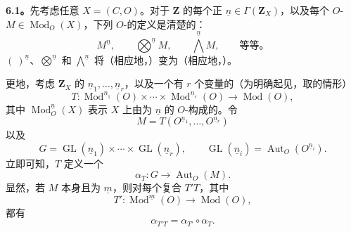 
\textbf{6.1。}先考虑任意 $X=(C,O)$。对于 $\mathbf Z$ 的每个正 $\underline n\in\Gamma(\mathbf Z_X)$，以及每个 $O$- $M\in\operatorname{Mod}_O(X)$，下列 $O$-的定义是清楚的：
\[
 M^{\underline n},\qquad \bigotimes^{\underline n}M,\qquad
 \bigwedge^{\underline n}M,\qquad\text{等等。}
 \tag{6.1.1}
\]
 $(\ )^{\underline n}$、$\bigotimes^{\underline n}$ 和 $\bigwedge^{\underline n}$ 将（相应地，）变为（相应地，）。

更地，考虑 $\mathbf Z_X$ 的 $\underline n_1,\ldots,\underline n_r$，以及一个有 $r$ 个变量的（为明确起见，取的情形）
\[
 T:\operatorname{Mod}^{\underline n_1}(O)\times\cdots\times
 \operatorname{Mod}^{\underline n_r}(O)\longrightarrow\operatorname{Mod}(O),
\]
其中 $\operatorname{Mod}^{\underline n}_O(X)$ 表示 $X$ 上由为 $\underline n$ 的 $O$-构成的。令
\[
 M=T(O^{\underline n_1},\ldots,O^{\underline n_r})
\]
以及
\[
 G=\operatorname{GL}(\underline n_1)\times\cdots\times
 \operatorname{GL}(\underline n_r),\qquad
 \operatorname{GL}(\underline n_i)=\operatorname{Aut}_O(O^{\underline n_i}).
\]
立即可知，$T$ 定义一个
\[
 \alpha_T:G\longrightarrow\operatorname{Aut}_O(M).\tag{6.1.2}
\]
显然，若 $M$ 本身且为 $\underline m$，则对每个复合 $T'T$，其中
\[
 T':\operatorname{Mod}^{\underline m}(O)\longrightarrow\operatorname{Mod}(O),
\]
都有
\[
 \alpha_{T'T}=\alpha_{T'}\circ\alpha_T.\tag{6.1.3}
\]

